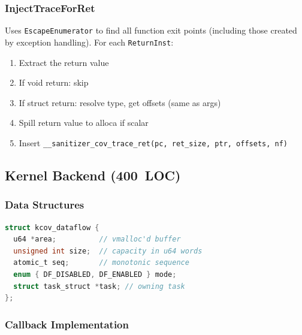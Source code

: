 \documentclass{ndss}
\begin{document}
\subsubsection{InjectTraceForRet}

Uses \texttt{EscapeEnumerator} to find all function exit points (including
those created by exception handling). For each \texttt{ReturnInst}:
\begin{enumerate}[nosep]
  \item Extract the return value
  \item If void return: skip
  \item If struct return: resolve type, get offsets (same as args)
  \item Spill return value to alloca if scalar
  \item Insert \texttt{\_\_sanitizer\_cov\_trace\_ret(pc, ret\_size, ptr,
        offsets, nf)}
\end{enumerate}

\subsection{Kernel Backend (400~LOC)}\label{sec:kernel-impl}

\subsubsection{Data Structures}

\begin{lstlisting}[language=C,caption={Kernel-side data structures (simplified).}]
struct kcov_dataflow {
  u64 *area;          // vmalloc'd buffer
  unsigned int size;  // capacity in u64 words
  atomic_t seq;       // monotonic sequence
  enum { DF_DISABLED, DF_ENABLED } mode;
  struct task_struct *task; // owning task
};
\end{lstlisting}

\subsubsection{Callback Implementation}
\end{document}
